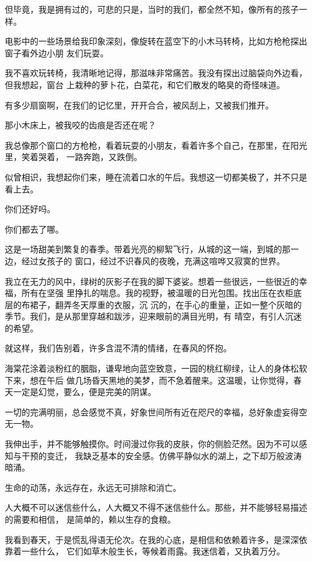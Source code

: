 		但毕竟，我是拥有过的，可悲的只是，当时的我们，都全然不知，像所有的孩子一样。

		电影中的一些场景给我印象深刻，像旋转在蓝空下的小木马转椅，比如方枪枪探出窗子看外边小朋
	友们玩耍。

		我不喜欢玩转椅，我清晰地记得，那滋味非常痛苦。我没有探出过脑袋向外边看，但我想起，窗台
	上栽种的萝卜花，白菜花，和它们散发的略臭的奇怪味道。

		有多少扇窗啊，在我们的记忆里，开开合合，被风刮上，又被我们推开。

		那小木床上，被我咬的齿痕是否还在呢？

		我总像那个窗口的方枪枪，看着玩耍的小朋友，看着许多个自己，在那里，在阳光里，笑着哭着，
	一路奔跑，又跌倒。

		似曾相识，我想起你们来，睡在流着口水的午后。我想这一切都美极了，并不只是看上去。

		你们还好吗。

		你们都去了哪。

	\endwriting



		这是一场甜美到繁复的春季。带着光亮的柳絮飞行，从城的这一端，到城的那一边，经过女孩子的
	窗口，经过不识春风的夜晚，充满这喧哗又寂寞的世界。

		我立在无力的风中，绿树的灰影子在我的脚下婆娑。想着一些很远，一些很近的幸福，所有在坚强
	里挣扎的喘息。我的视野，被温暖的日光包围。找出压在衣柜底层的布裙子，翻弄冬天厚重的衣服，沉
	沉的，在手心的重量，正如一整个灰暗的季节。我们，是从那里穿越和跋涉，迎来眼前的满目光明，有
	晴空，有引人沉迷的希望。

		就这样，我们告别着，许多含混不清的情绪，在春风的怀抱。

		海棠花涂着淡粉红的胭脂，谦卑地向蓝空致意，一园的桃红柳绿，让人的身体松软下来，想在午后
	做几场昏天黑地的美梦，而不急着醒来。这温暖，让你觉得，春天一定是幻觉，要么，便是完美的阴谋。

		一切的完满明丽，总会感觉不真，好象世间所有近在咫尺的幸福，总好象虚妄得空无一物。

		我伸出手，并不能够触摸你。时间漫过你我的皮肤，你的侧脸茫然。因为不可以感知与干预的变迁，
	我缺乏基本的安全感。仿佛平静似水的湖上，之下却万般波涛暗涌。

		生命的动荡，永远存在，永远无可排除和消亡。

		人大概不可以迷信些什么，人大概又不得不迷信些什么。那些，并不能够轻易描述的需要和相信，
	是简单的，赖以生存的食粮。

		我看到春天，于是慌乱得语无伦次。在我的心底，是相信和依赖着许多，是深深依靠着一些什么，
	它们如草木般生长，等候着雨露。我迷信着，又执着万分。


